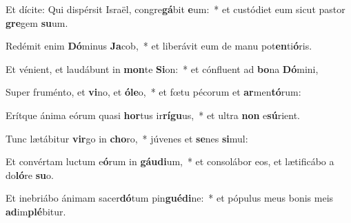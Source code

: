 \item Et dícite: Qui dispérsit Israël, congre\textbf{gá}bit \textbf{e}um:~* et custódiet eum sicut pastor \textbf{gre}gem \textbf{su}um.
\item Redémit enim \textbf{Dó}minus \textbf{Ja}cob,~* et liberávit eum de manu pot\textbf{en}ti\textbf{ó}ris.
\item Et vénient, et laudábunt in \textbf{mon}te \textbf{Si}on:~* et cónfluent ad \textbf{bo}na \textbf{Dó}mini,
\item Super fruménto, et \textbf{vi}no, et \textbf{ó}\textbf{le}o,~* et fœtu pécorum et \textbf{ar}men\textbf{tó}rum:
\item Erítque ánima eórum quasi \textbf{hor}tus ir\textbf{rí}\textbf{gu}us,~* et ultra \textbf{non} e\textbf{sú}rient.
\item Tunc lætábitur \textbf{vir}go in \textbf{cho}ro,~* júvenes et \textbf{se}nes \textbf{si}mul:
\item Et convértam luctum e\textbf{ó}rum in \textbf{gáu}\textbf{di}um,~* et consolábor eos, et lætificábo a do\textbf{ló}re \textbf{su}o.
\item Et inebriábo ánimam sacer\textbf{dó}tum pin\textbf{gué}\textbf{di}ne:~* et pópulus meus bonis meis \textbf{ad}im\textbf{plé}bitur.
